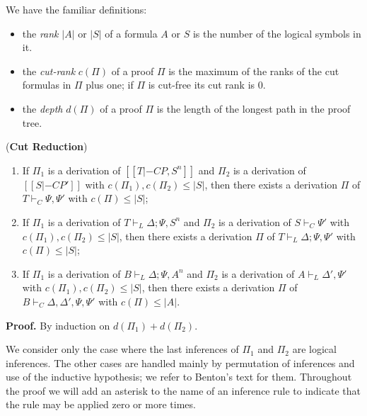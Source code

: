 We have the familiar definitions: 
\begin{itemize}
\item the \emph{rank} $|A|$ or $|S|$ of a formula $A$ or $S$ is the number of the logical symbols in it.
\item the \emph{cut-rank} $c(\Pi)$ of a proof $\Pi$ is the maximum of the ranks of the cut formulas in $\Pi$ plus one; 
if $\Pi$ is cut-free its cut rank is 0.
\item the \emph{depth} $d(\Pi)$ of a proof $\Pi$ is the length of the longest path in the proof tree.
\end{itemize}
\begin{lemma}
\end{lemma} ({\bf Cut Reduction}) 
\begin{enumerate}
\item If $\Pi_1$ is a derivation of $[[T |-C P, S^n]]$ and  $\Pi_2$ is a derivation of $[[S |-C P']]$ with 
$c(\Pi_1), c(\Pi_2) \leq |S|$, then there exists a derivation $\Pi$ of $T\vdash_C \Psi, \Psi'$ with $c(\Pi) \leq |S|$;
\item If $\Pi_1$ is a derivation of $T \vdash_L \Delta; \Psi, S^n$ and  $\Pi_2$ is a derivation of $S \vdash_C\Psi'$ with 
$c(\Pi_1), c(\Pi_2) \leq |S|$, then there exists a derivation $\Pi$ of $T\vdash_L \Delta; \Psi, \Psi'$ with $c(\Pi) \leq |S|$;
\item If $\Pi_1$ is a derivation of $B\vdash_L \Delta; \Psi, A^n$ and  $\Pi_2$ is a derivation of $A \vdash_L\Delta', \Psi'$ with $c(\Pi_1), c(\Pi_2) \leq |S|$, then there exists a derivation $\Pi$ of $B\vdash_C\Delta, \Delta', \Psi, \Psi'$ with $c(\Pi) \leq |A|$.
\end{enumerate}

\noindent
{\bf Proof.} By induction on $d(\Pi_1) + d(\Pi_2)$.   

\noindent
We consider only the case where the last inferences of $\Pi_1$ and $\Pi_2$ are logical inferences. The other cases 
are handled mainly by permutation of inferences and use of the inductive hypothesis; we refer to Benton's text for them.  Throughout the proof we will add an asterisk to the name of an inference rule to indicate that the rule may be applied zero or more times.

\vspace{1ex}

